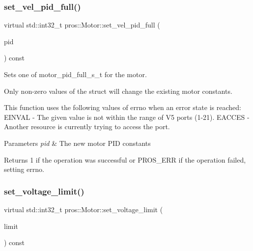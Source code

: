 \subsubsection{\texorpdfstring{set\_vel\_pid\_full()}{set\_vel\_pid\_full()}}
{\footnotesize\ttfamily virtual std\+::int32\+\_\+t pros\+::\+Motor\+::set\+\_\+vel\+\_\+pid\+\_\+full (\begin{DoxyParamCaption}\item[{const \mbox{\hyperlink{motors_8h_a0295cbf49f5c70c17b5fa962bd25febd}{motor\+\_\+pid\+\_\+full\+\_\+s\+\_\+t}}}]{pid }\end{DoxyParamCaption}) const\hspace{0.3cm}{\ttfamily [virtual]}}



Sets one of motor\+\_\+pid\+\_\+full\+\_\+s\+\_\+t for the motor. 

Only non-\/zero values of the struct will change the existing motor constants.

This function uses the following values of errno when an error state is reached\+: E\+I\+N\+V\+AL -\/ The given value is not within the range of V5 ports (1-\/21). E\+A\+C\+C\+ES -\/ Another resource is currently trying to access the port.


\begin{DoxyParams}{Parameters}
{\em pid} & The new motor P\+ID constants\\
\hline
\end{DoxyParams}
\begin{DoxyReturn}{Returns}
1 if the operation was successful or P\+R\+O\+S\+\_\+\+E\+RR if the operation failed, setting errno. 
\end{DoxyReturn}
\mbox{\label{classpros_1_1Motor_a3cd7e4ca0714b533d873796cf8b74a81}} 
\subsubsection{\texorpdfstring{set\_voltage\_limit()}{set\_voltage\_limit()}}
{\footnotesize\ttfamily virtual std\+::int32\+\_\+t pros\+::\+Motor\+::set\+\_\+voltage\+\_\+limit (\begin{DoxyParamCaption}\item[{const std\+::int32\+\_\+t}]{limit }\end{DoxyParamCaption}) const\hspace{0.3cm}{\ttfamily [virtual]}}



